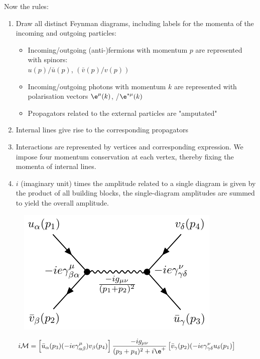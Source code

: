 \documentclass[a4paper, 11pt, normalem]{report}
\begin{document}
Now the rules:
\begin{enumerate}
    \item Draw all distinct Feynman diagrams, including labels for the momenta of the incoming and outgoing particles:
        \begin{itemize}
            \item Incoming/outgoing (anti-)fermions with momentum $p$ are represented with spinors:\\ $u(p)/\bar{u}(p)$,  $(\bar{v}(p)/v(p))$
            \item Incoming/outgoing photons with momentum $k$ are represented with polarisation vectors $\e^\mu(k)$, /$\e^{*\mu}(k)$
            \item Propagators related to the external particles are "amputated"
        \end{itemize}
    \item Internal lines give rise to the corresponding propagators
    \item Interactions are represented by vertices and corresponding expression.
        We impose four momentum conservation at each vertex, thereby fixing the momenta of internal lines.
    \item $i$ (imaginary unit) times the amplitude related to a single diagram is given by the product of all building blocks, the single-diagram amplitudes are summed to yield the overall amplitude.
\end{enumerate}
\begin{figure}[H]
    \centering
    \includegraphics{etomu2.pdf}
    \vspace{-25pt}
\end{figure}
\begin{align}
    i\mathcal{M} &= \left[\bar{u}_{\alpha}(p_3)(-ie\gamma^\mu_{\alpha\beta})v_\beta(p_4)\right]\frac{-ig_{\mu\nu}}{(p_3+p_4)^2+i\e^+}\left[\bar{v}_\gamma(p_2)(-ie\gamma^\nu_{\gamma\delta}u_\delta(p_1)\right]
\end{align}
\end{document}

